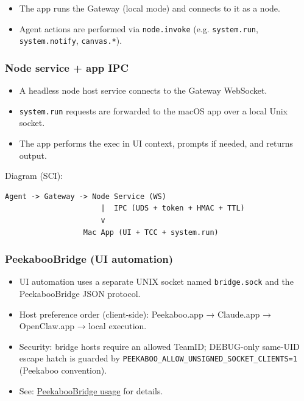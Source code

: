 \begin{itemize}
  \item The app runs the Gateway (local mode) and connects to it as a node.
  \item Agent actions are performed via \texttt{node.invoke} (e.g. \texttt{system.run}, \texttt{system.notify}, \texttt{canvas.*}).
\end{itemize}


\subsubsection{Node service + app IPC}


\begin{itemize}
  \item A headless node host service connects to the Gateway WebSocket.
  \item \texttt{system.run} requests are forwarded to the macOS app over a local Unix socket.
  \item The app performs the exec in UI context, prompts if needed, and returns output.
\end{itemize}


Diagram (SCI):

\begin{lstlisting}
Agent -> Gateway -> Node Service (WS)
                      |  IPC (UDS + token + HMAC + TTL)
                      v
                  Mac App (UI + TCC + system.run)
\end{lstlisting}


\subsubsection{PeekabooBridge (UI automation)}


\begin{itemize}
  \item UI automation uses a separate UNIX socket named \texttt{bridge.sock} and the PeekabooBridge JSON protocol.
  \item Host preference order (client-side): Peekaboo.app → Claude.app → OpenClaw.app → local execution.
  \item Security: bridge hosts require an allowed TeamID; DEBUG-only same-UID escape hatch is guarded by \texttt{PEEKABOO\_ALLOW\_UNSIGNED\_SOCKET\_CLIENTS=1} (Peekaboo convention).
  \item See: \href{/platforms/mac/peekaboo}{PeekabooBridge usage} for details.
\end{itemize}


